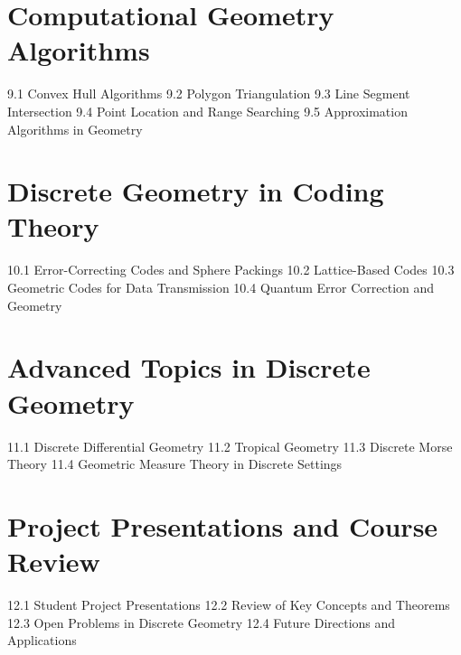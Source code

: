 \section{Computational Geometry Algorithms}
9.1 Convex Hull Algorithms
9.2 Polygon Triangulation
9.3 Line Segment Intersection
9.4 Point Location and Range Searching
9.5 Approximation Algorithms in Geometry
\section{Discrete Geometry in Coding Theory}
10.1 Error-Correcting Codes and Sphere Packings
10.2 Lattice-Based Codes
10.3 Geometric Codes for Data Transmission
10.4 Quantum Error Correction and Geometry
\section{Advanced Topics in Discrete Geometry}
11.1 Discrete Differential Geometry
11.2 Tropical Geometry
11.3 Discrete Morse Theory
11.4 Geometric Measure Theory in Discrete Settings
\section{Project Presentations and Course Review}
12.1 Student Project Presentations
12.2 Review of Key Concepts and Theorems
12.3 Open Problems in Discrete Geometry
12.4 Future Directions and Applications
